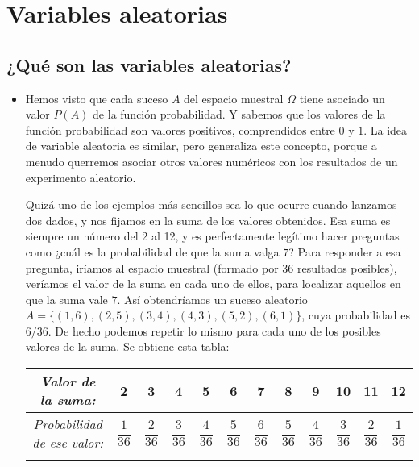 
\section{Variables aleatorias}\label{sec:variablesAletorias}


\subsection{¿Qué son las variables aleatorias?}

\begin{itemize}

    \item Hemos visto que cada suceso $A$ del espacio muestral $\Omega$ tiene asociado un valor $P(A)$ de la función probabilidad. Y sabemos que los valores de la función probabilidad son valores positivos, comprendidos entre $0$ y $1$. La idea de variable aleatoria es similar, pero generaliza este concepto, porque a menudo querremos asociar otros valores numéricos con los resultados de un experimento aleatorio.
        \begin{Ejemplo}\label{ejem:VariableAleatoria:SumaDosDados}
        Quizá uno de los ejemplos más sencillos sea lo que ocurre cuando lanzamos dos dados, y nos fijamos
        en la suma de los valores obtenidos. Esa suma es siempre un número del 2 al 12, y es perfectamente
        legítimo hacer preguntas como ¿cuál es la probabilidad de que  la suma valga $7$? Para responder a esa
        pregunta, iríamos al espacio muestral (formado por 36 resultados posibles), veríamos el valor de la suma
        en cada uno de ellos, para localizar aquellos en que la suma vale $7$. Así obtendríamos un suceso
        aleatorio $A=\{(1,6),(2,5),(3,4),(4,3),(5,2),(6,1)\}$, cuya probabilidad es $6/36$. De hecho podemos
        repetir lo mismo para cada uno de los posibles valores de la suma. Se obtiene esta tabla:\\[3mm]
        \begin{tabular}[t]{|c|c|c|c|c|c|c|c|c|c|c|c|}
        \hline
        \rule{0cm}{0.5cm}{\em Valor de la suma:}&2&3&4&5&6&7&8&9&10&11&12\\
        \hline
        \rule{0cm}{0.7cm}{\em Probabilidad de ese valor:}&$\dfrac{1}{36}$&$\dfrac{2}{36}$&$\dfrac{3}{36}$&$\dfrac{4}{36}$&$\dfrac{5}{36}$&$\dfrac{6}{36}$&$\dfrac{5}{36}$&$\dfrac{4}{36}$&$\dfrac{3}{36}$&$\dfrac{2}{36}$&$\dfrac{1}{36}$\\
        &&&&&&&&&&&\\

\end{tabular}
\end{Ejemplo}
\end{itemize}
